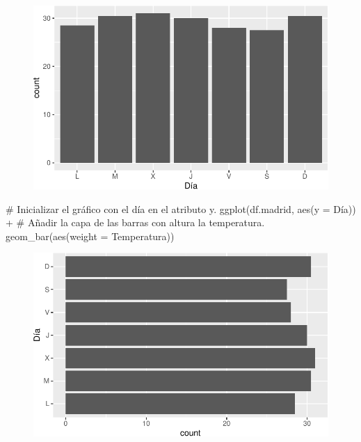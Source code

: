 \documentclass[
  a4paper,
]{scrreport}
\newenvironment{Shaded}{\begin{snugshade}}{\end{snugshade}}
\newcommand{\AttributeTok}[1]{\textcolor[rgb]{0.40,0.45,0.13}{#1}}
\newcommand{\CommentTok}[1]{\textcolor[rgb]{0.37,0.37,0.37}{#1}}
\newcommand{\FunctionTok}[1]{\textcolor[rgb]{0.28,0.35,0.67}{#1}}
\newcommand{\NormalTok}[1]{\textcolor[rgb]{0.00,0.23,0.31}{#1}}
\newcommand{\SpecialCharTok}[1]{\textcolor[rgb]{0.37,0.37,0.37}{#1}}
\theoremstyle{definition}
\theoremstyle{definition}
\theoremstyle{remark}
\begin{document}
\begin{figure}[H]

{\centering \includegraphics{./07-graficos_files/figure-pdf/unnamed-chunk-9-1.pdf}

}

\end{figure}

\begin{Shaded}
\begin{Highlighting}[]
\CommentTok{\# Inicializar el gráfico con el día en el atributo y.}
\FunctionTok{ggplot}\NormalTok{(df.madrid, }\FunctionTok{aes}\NormalTok{(}\AttributeTok{y =}\NormalTok{ Día)) }\SpecialCharTok{+}
\CommentTok{\# Añadir la capa de las barras con altura la temperatura.}
    \FunctionTok{geom\_bar}\NormalTok{(}\FunctionTok{aes}\NormalTok{(}\AttributeTok{weight =}\NormalTok{ Temperatura))}
\end{Highlighting}
\end{Shaded}

\begin{figure}[H]

{\centering \includegraphics{./07-graficos_files/figure-pdf/unnamed-chunk-10-1.pdf}

}

\end{figure}
\end{document}
